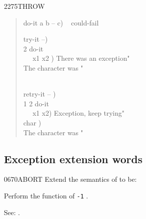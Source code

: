 \begin{newword}{2275}{THROW}
\begin{rationale}
\begin{quote}
		\word{:} do-it  a b -- c) ~
			 could-fail \word{;}

		\word{:} try-it  --) \\
		 2 \word{[']} do-it~ ~  \\
		\tab~~  x1 x2 ) 
			  There was an exception"  \\
		\tab {}
			 The character was "   \\
		\tab {} \\
		\word{;}

		\word{;} retry-it  -- ) \\
		\tab {}  1 2 \word{[']} do-it ~
			 \\
		\tab~~  x1 x2) 
			 Exception, keep trying"  \\
		\tab {}  char ) \\
		\tab {} The character was "   \\
		\word{;}
	\end{quote}
\end{rationale}
\end{newword}


\subsection{Exception extension words} %
\extended

\begin{newword}{0670}{ABORT}
	Extend the semantics of  to be:


	Perform the function of \texttt{-1} .

\item[See:]
	.
\end{newword}


